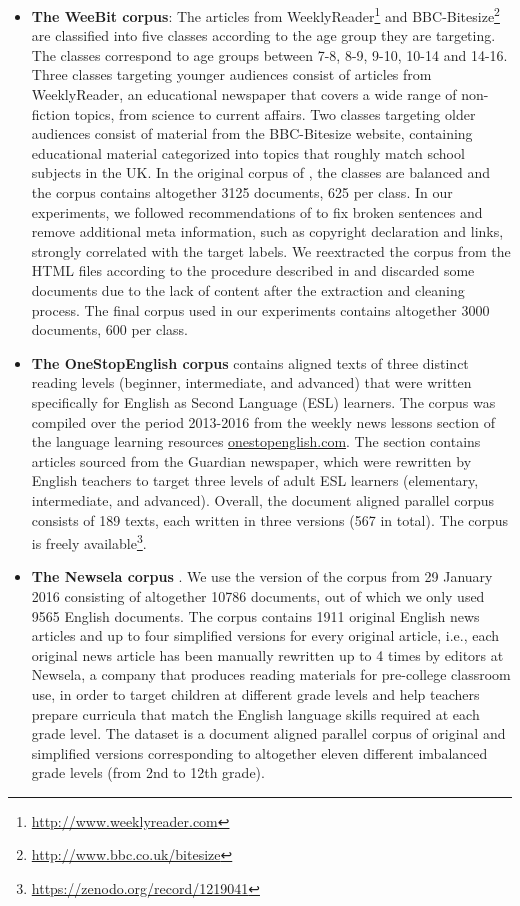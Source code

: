 \documentclass{clv3}
\begin{document}
\begin{itemize}
    \item { \bf The WeeBit corpus}: The articles from WeeklyReader\footnote{\url{http://www.weeklyreader.com}} and BBC-Bitesize\footnote{\url{http://www.bbc.co.uk/bitesize}} are classified into five classes according to the age group they are targeting. The classes correspond to age groups between 7-8, 8-9, 9-10, 10-14 and 14-16. Three classes targeting younger audiences consist of articles from WeeklyReader, an educational newspaper that covers a  wide range of non-fiction topics, from science to current affairs. Two classes targeting older audiences consist of material from the BBC-Bitesize website, containing educational material categorized into topics that roughly match school subjects in the UK. In the original corpus of \citet{vajjala2012improving}, the classes are balanced and the corpus contains altogether \num{3125} documents, \num{625} per class. In our experiments, we followed recommendations of \citet{xia2016text} to fix broken sentences and remove additional meta information, such as copyright declaration and links, strongly correlated with the target labels. We reextracted the corpus from the HTML files according to the procedure described in \citet{xia2016text} and discarded some documents due to the lack of content after the extraction and cleaning process. The final corpus used in our experiments contains altogether \num{3000} documents, \num{600} per class. 
    \item { \bf The OneStopEnglish corpus} \citep{vajjala2018onestopenglish} contains aligned texts of three distinct reading levels (beginner, intermediate, and advanced) that were written specifically for English as Second Language (ESL) learners. The corpus was compiled over the period 2013-2016 from the weekly news lessons section of the language learning resources \url{onestopenglish.com}. The section contains articles sourced from the Guardian newspaper, which were rewritten by English teachers to target three levels of adult ESL learners (elementary, intermediate, and advanced). Overall, the document aligned parallel corpus consists of 189 texts, each written in three versions (567 in total). The corpus is freely available\footnote{\url{https://zenodo.org/record/1219041}}.
    \item { \bf The Newsela corpus} \citep{xu2015problems}. We use the version of the corpus from 29 January 2016 consisting of altogether \num{10786} documents, out of which we only used \num{9565} English documents. The corpus contains \num{1911} original English news articles and up to four simplified versions for every original article, i.e., each original news article has been manually rewritten up to 4 times by editors at Newsela, a company that produces reading materials for pre-college classroom use, in order to target children at different grade levels and help teachers prepare curricula that match the English language skills required at each grade level. The dataset is a document aligned parallel corpus of original and simplified versions corresponding to altogether eleven different imbalanced grade levels (from 2nd to 12th grade). 
    

\end{itemize}
\end{document}

